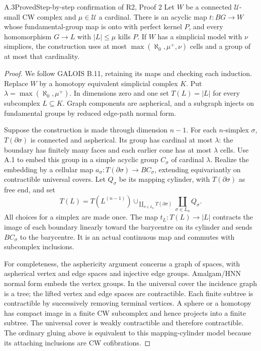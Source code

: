 \begin{claim}{A.3}{Proved}{Step-by-step confirmation of R2, Proof 2}
Let $W$ be a connected $\mathcal U$-small CW complex and
$\mu\in\mathcal U$ a cardinal. There is an acyclic map $t:BG\to W$
whose fundamental-group map is onto with perfect kernel $P$, and every
homomorphism $G\to L$ with $|L|\leq\mu$ kills $P$.
If $W$ has a simplicial model with $\nu$ simplices, the construction
uses at most $\max(\aleph_0,\mu^+,\nu)$ cells and a group of at most
that cardinality.
\end{claim}
\begin{proof}
We follow GALOIS B.11, retaining its maps and checking each induction.
Replace $W$ by a homotopy equivalent simplicial complex $K$. Put
$\lambda=\max(\aleph_0,\mu^+)$. In dimensions zero and one set
$T(L)=|L|$ for every subcomplex $L\subseteq K$. Graph components are
aspherical, and a subgraph injects on fundamental groups by reduced
edge-path normal form.

Suppose the construction is made through dimension $n-1$. For each
$n$-simplex $\sigma$, $T(\partial\sigma)$ is connected and aspherical.
Its group has cardinal at most $\lambda$: the boundary has finitely
many faces and each earlier cone has at most $\lambda$ cells. Use A.1
to embed this group in a simple acyclic group $C_\sigma$ of cardinal
$\lambda$. Realize the embedding by a cellular map
$a_\sigma:T(\partial\sigma)\to BC_\sigma$, extending equivariantly
on contractible universal covers. Let $Q_\sigma$ be its mapping
cylinder, with $T(\partial\sigma)$ as free end, and set
\[
 T(L)=T(L^{(n-1)})\cup_{\coprod_{\sigma\in L_n}T(\partial\sigma)}
                       \coprod_{\sigma\in L_n}Q_\sigma.
\]
All choices for a simplex are made once. The map $t_L:T(L)\to |L|$
contracts the image of each boundary linearly toward the barycentre
on its cylinder and sends $BC_\sigma$ to the barycentre. It is an
actual continuous map and commutes with subcomplex inclusions.

For completeness, the asphericity argument concerns a graph of spaces,
with aspherical vertex and edge spaces and injective edge groups.
Amalgam/HNN normal form embeds the vertex groups. In the universal
cover the incidence graph is a tree; the lifted vertex and edge spaces
are contractible. Each finite subtree is contractible by successively
removing terminal vertices. A sphere or a homotopy has compact image
in a finite CW subcomplex and hence projects into a finite subtree.
The universal cover is weakly contractible and therefore contractible.
The ordinary gluing above is equivalent to this mapping-cylinder model
because its attaching inclusions are CW cofibrations.


\end{proof}
